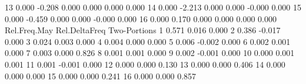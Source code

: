 \documentclass{article}
\begin{document}
\begin{Schunk}
\begin{Soutput}
13          0.000    -0.208         0.000         0.000     0.000        0.000
14          0.000    -2.213         0.000         0.000    -0.000        0.000
15          0.000    -0.459         0.000         0.000    -0.000        0.000
16          0.000     0.170         0.000         0.000     0.000        0.000
   Rel.Freq.May Rel.DeltaFreq Two-Portions
1         0.571         0.016        0.000
2         0.386        -0.017        0.000
3         0.024         0.003        0.000
4         0.004         0.000        0.000
5         0.006        -0.002        0.000
6         0.002         0.001        0.000
7         0.003         0.000        0.826
8         0.001         0.001        0.000
9         0.002        -0.001        0.000
10        0.000         0.001        0.001
11        0.001        -0.001        0.000
12        0.000         0.000        0.130
13        0.000         0.000        0.406
14        0.000         0.000        0.000
15        0.000         0.000        0.241
16        0.000         0.000        0.857
\end{Soutput}
\end{Schunk}
\end{document}
